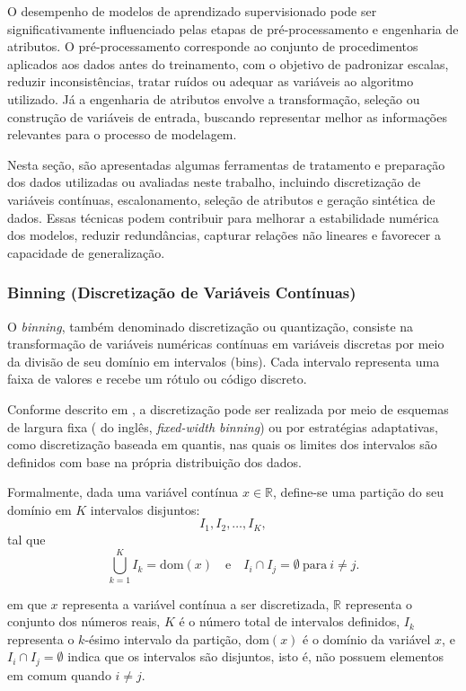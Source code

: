 O desempenho de modelos de aprendizado supervisionado pode ser significativamente influenciado pelas etapas de pré-processamento e engenharia de atributos. O pré-processamento corresponde ao conjunto de procedimentos aplicados aos dados antes do treinamento, com o objetivo de padronizar escalas, reduzir inconsistências, tratar ruídos ou adequar as variáveis ao algoritmo utilizado. Já a engenharia de atributos envolve a transformação, seleção ou construção de variáveis de entrada, buscando representar melhor as informações relevantes para o processo de modelagem.

Nesta seção, são apresentadas algumas ferramentas de tratamento e preparação dos dados utilizadas ou avaliadas neste trabalho, incluindo discretização de variáveis contínuas, escalonamento, seleção de atributos e geração sintética de dados. Essas técnicas podem contribuir para melhorar a estabilidade numérica dos modelos, reduzir redundâncias, capturar relações não lineares e favorecer a capacidade de generalização.

\subsubsection{Binning (Discretização de Variáveis Contínuas)}

O \textit{binning}, também denominado discretização ou quantização, consiste na transformação de variáveis numéricas contínuas em variáveis discretas por meio da divisão de seu domínio em intervalos (bins). Cada intervalo representa uma faixa de valores e recebe um rótulo ou código discreto.

Conforme descrito em \cite{Sarkar2018PML}, a discretização pode ser realizada por meio de esquemas de largura fixa ( do inglês, \textit{fixed-width binning}) ou por estratégias adaptativas, como discretização baseada em quantis, nas quais os limites dos intervalos são definidos com base na própria distribuição dos dados.

Formalmente, dada uma variável contínua \(x \in \mathbb{R}\), define-se uma partição do seu domínio em \(K\) intervalos disjuntos:
\[
I_1, I_2, \dots, I_K,
\]
tal que
\[
\bigcup_{k=1}^{K} I_k = \mathrm{dom}(x)
\quad \text{e} \quad
I_i \cap I_j = \emptyset \ \text{para} \ i \neq j.
\]

\noindent em que \(x\) representa a variável contínua a ser discretizada, \(\mathbb{R}\) representa o conjunto dos números reais, \(K\) é o número total de intervalos definidos, \(I_k\) representa o \(k\)-ésimo intervalo da partição, \(\mathrm{dom}(x)\) é o domínio da variável \(x\), e \(I_i \cap I_j = \emptyset\) indica que os intervalos são disjuntos, isto é, não possuem elementos em comum quando \(i \neq j\).

